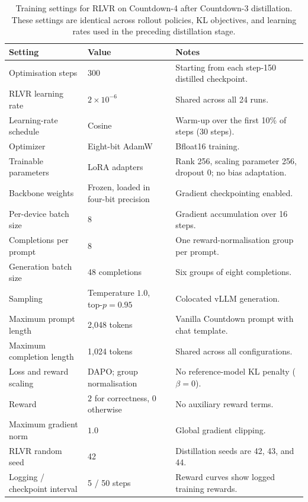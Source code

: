 \documentclass{article} %
\theoremstyle{plain}
\theoremstyle{definition}
\theoremstyle{remark}
\begin{document}
\begin{table}[t]
\centering
\small
\setlength{\tabcolsep}{5pt}
\renewcommand{\arraystretch}{1.12}
\begin{tabularx}{\textwidth}{p{}p{}X}
\toprule
Setting & Value & Notes \\
\midrule
Optimisation steps & 300 & Starting from each step-150 distilled checkpoint. \\
RLVR learning rate & $2\times10^{-6}$ & Shared across all 24 runs. \\
Learning-rate schedule & Cosine & Warm-up over the first 10\% of steps (30 steps). \\
Optimizer & Eight-bit AdamW & Bfloat16 training. \\
Trainable parameters & LoRA adapters & Rank 256, scaling parameter 256, dropout 0; no bias adaptation. \\
Backbone weights & Frozen, loaded in four-bit precision & Gradient checkpointing enabled. \\
Per-device batch size & 8 & Gradient accumulation over 16 steps. \\
Completions per prompt & 8 & One reward-normalisation group per prompt. \\
Generation batch size & 48 completions & Six groups of eight completions. \\
Sampling & Temperature $1.0$, top-$p=0.95$ & Colocated vLLM generation. \\
Maximum prompt length & 2,048 tokens & Vanilla Countdown prompt with chat template. \\
Maximum completion length & 1,024 tokens & Shared across all configurations. \\
Loss and reward scaling & DAPO; group normalisation & No reference-model KL penalty ($\beta=0$). \\
Reward & $2$ for correctness, $0$ otherwise & No auxiliary reward terms. \\
Maximum gradient norm & $1.0$ & Global gradient clipping. \\
RLVR random seed & 42 & Distillation seeds are 42, 43, and 44. \\
Logging / checkpoint interval & 5 / 50 steps & Reward curves show logged training rewards. \\
\bottomrule
\end{tabularx}
\caption{Training settings for RLVR on Countdown-4 after Countdown-3 distillation. These settings are identical across rollout policies, KL objectives, and learning rates used in the preceding distillation stage.}
\label{tab:downstream_rlvr_protocol}
\end{table}
\end{document}
